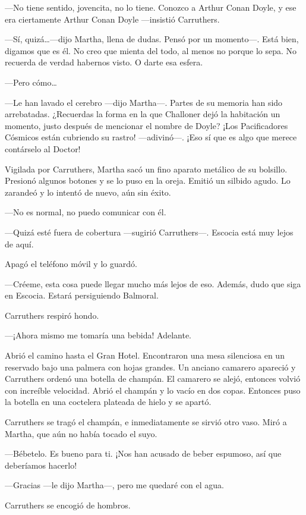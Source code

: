 ---No tiene sentido, jovencita, no lo tiene. Conozco a Arthur Conan
Doyle, y ese era ciertamente Arthur Conan Doyle ---insistió Carruthers.

---Sí, quizá\ldots{}---dijo Martha, llena de dudas. Pensó por un
momento---. Está bien, digamos que es él. No creo que mienta del todo,
al menos no porque lo sepa. No recuerda de verdad habernos visto. O
darte esa esfera.

---Pero cómo\ldots{}

---Le han lavado el cerebro ---dijo Martha---. Partes de su memoria han
sido arrebatadas. ¿Recuerdas la forma en la que Challoner dejó la
habitación un momento, justo después de mencionar el nombre de Doyle?
¡Los Pacificadores Cósmicos están cubriendo su rastro! ---adivinó---.
¡Eso sí que es algo que merece contárselo al Doctor!

Vigilada por Carruthers, Martha sacó un fino aparato metálico de su
bolsillo. Presionó algunos botones y se lo puso en la oreja. Emitió un
silbido agudo. Lo zarandeó y lo intentó de nuevo, aún sin éxito.

---No es normal, no puedo comunicar con él.

---Quizá esté fuera de cobertura ---sugirió Carruthers---. Escocia está
muy lejos de aquí.

Apagó el teléfono móvil y lo guardó.

---Créeme, esta cosa puede llegar mucho más lejos de eso. Además, dudo
que siga en Escocia. Estará persiguiendo Balmoral.

Carruthers respiró hondo.

---¡Ahora mismo me tomaría una bebida! Adelante.

Abrió el camino hasta el Gran Hotel. Encontraron una mesa silenciosa en
un reservado bajo una palmera con hojas grandes. Un anciano camarero
apareció y Carruthers ordenó una botella de champán. El camarero se
alejó, entonces volvió con increíble velocidad. Abrió el champán y lo
vacío en dos copas. Entonces puso la botella en una coctelera plateada
de hielo y se apartó.

Carruthers se tragó el champán, e inmediatamente se sirvió otro vaso.
Miró a Martha, que aún no había tocado el suyo.

---Bébetelo. Es bueno para ti. ¡Nos han acusado de beber espumoso, así
que deberíamos hacerlo!

---Gracias ---le dijo Martha---, pero me quedaré con el agua.

Carruthers se encogió de hombros.

